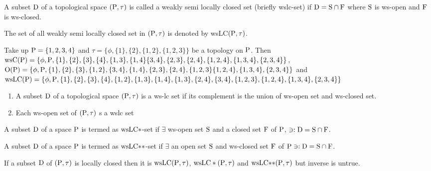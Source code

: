 \begin{dfn}\label{defi6.2.1}
A subset $\mathrm{D}$ of a topological space $(\mathrm{P}, \tau)$ is called a weakly semi locally closed set (briefly wslc-set) if $\mathrm{D} = \mathrm{S} \cap \mathrm{F}$ where $\mathrm{S}$ is ws-open and $\mathrm{F}$ is ws-closed.
\end{dfn}

The set of all weakly semi locally closed set in $(\mathrm{P},\tau)$ is denoted by wsLC$(\mathrm{P}, \tau)$.

\begin{exm}\label{exam6.2.2}
Take up $\mathrm{P} = \{1,2,3,4\}$ and $\tau = \{\phi, \{1\}, \{2\}, \{1,2\},\{1,2,3\}\}$ be a topology on $\mathrm{P}$. Then $\ws\TSC(\TSP) = \{\phi, \TSP,\{1\}, \{2\}, \{3\}, \{4\}, \{1,3\}, \{1,4\} \{3,4\}, \{2,3\},\break \{2,4\}, \{1,2,4\},\{1,3,4\},\{2,3,4\}\}$, $\TSO(\TSP) = \{\phi, \TSP, \{1\}, \{2\}, \{3\},\{1,2\}, \{3,4\}, \{1,4\},\break \{2,3\}, \{2,4\}, \{1,2,3\}\{1,2,4\},\{1,3,4\},\{2,3,4\}\}$ and $\ws\LC(\TSP)=\{\phi,\TSP,\{1\},\{2\},\{3\},\break \{4\},\{1,2\},\{1,3\},\{1,4\},\{1,3\},\{2,4\},\{3,4\},\{1,2,3\},\{1,2,4\},\{1,3,4\},\{2,3,4\}\}$
\end{exm}

\begin{rem}\label{rem6.2.3}
\begin{enumerate}[(1)]
\item A subset $\mathrm{D}$ of a topological space $(\mathrm{P}, \tau)$ is a ws-lc set if its complement is the union of ws-open set and ws-closed set.
\item Each ws-open set of $(\mathrm{P}, \tau)$ s a wslc set
\end{enumerate}
\end{rem}

\begin{dfn}\label{defi6.2.4}
A subset $\mathrm{D}$ of a space $\mathrm{P}$ is termed as $\mathrm{ws}\mathrm{LC}*$-set if $\exists$ ws-open set $\mathrm{S}$ and a closed set $\mathrm{F}$ of $\mathrm{P}$, $\ni: \mathrm{D} = \mathrm{S} \cap \mathrm{F}$.
\end{dfn}

\begin{dfn}\label{defi6.2.5}
A subset $\mathrm{D}$ of a space $\mathrm{P}$ is termed as $\mathrm{ws}\mathrm{LC}{*}{*}$-set if $\exists$ an open set $\mathrm{S}$ and ws-closed set $\mathrm{F}$ of $\mathrm{P} \ni: \mathrm{D} = \mathrm{S}\cap \mathrm{F}$.
\end{dfn}

\begin{thm}\label{thm6.2.6}
If a subset $\mathrm{D}$ of $(\mathrm{P}, \tau)$ is locally closed then it is $\mathrm{ws}\mathrm{LC}(\mathrm{P}, \tau)$, $\mathrm{ws}\mathrm{LC}*(\mathrm{P}, \tau)$ and $\mathrm{ws}\mathrm{LC}{*}{*}(\mathrm{P}, \tau)$ but inverse is untrue.
\end{thm}

